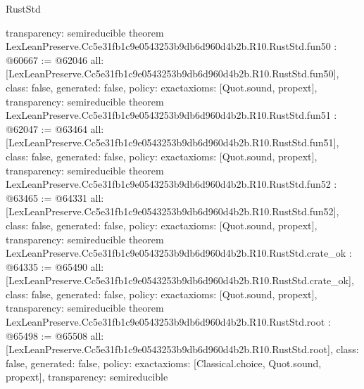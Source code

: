 \begin{lexlean}{RustStd}
\begin{coremodule}
{  transparency: semireducible
}
theorem LexLeanPreserve.Cc5e31fb1c9e0543253b9db6d960d4b2b.R10.RustStd.fun50 : @60667 := @62046 {
  all: [LexLeanPreserve.Cc5e31fb1c9e0543253b9db6d960d4b2b.R10.RustStd.fun50],
  class: false,
  generated: false,
  policy: exact{axioms: [Quot.sound, propext]},
  transparency: semireducible
}
theorem LexLeanPreserve.Cc5e31fb1c9e0543253b9db6d960d4b2b.R10.RustStd.fun51 : @62047 := @63464 {
  all: [LexLeanPreserve.Cc5e31fb1c9e0543253b9db6d960d4b2b.R10.RustStd.fun51],
  class: false,
  generated: false,
  policy: exact{axioms: [Quot.sound, propext]},
  transparency: semireducible
}
theorem LexLeanPreserve.Cc5e31fb1c9e0543253b9db6d960d4b2b.R10.RustStd.fun52 : @63465 := @64331 {
  all: [LexLeanPreserve.Cc5e31fb1c9e0543253b9db6d960d4b2b.R10.RustStd.fun52],
  class: false,
  generated: false,
  policy: exact{axioms: [Quot.sound, propext]},
  transparency: semireducible
}
theorem LexLeanPreserve.Cc5e31fb1c9e0543253b9db6d960d4b2b.R10.RustStd.crate_ok : @64335 := @65490 {
  all: [LexLeanPreserve.Cc5e31fb1c9e0543253b9db6d960d4b2b.R10.RustStd.crate_ok],
  class: false,
  generated: false,
  policy: exact{axioms: [Quot.sound, propext]},
  transparency: semireducible
}
theorem LexLeanPreserve.Cc5e31fb1c9e0543253b9db6d960d4b2b.R10.RustStd.root : @65498 := @65508 {
  all: [LexLeanPreserve.Cc5e31fb1c9e0543253b9db6d960d4b2b.R10.RustStd.root],
  class: false,
  generated: false,
  policy: exact{axioms: [Classical.choice, Quot.sound, propext]},
  transparency: semireducible
}


\end{coremodule}
\end{lexlean}
